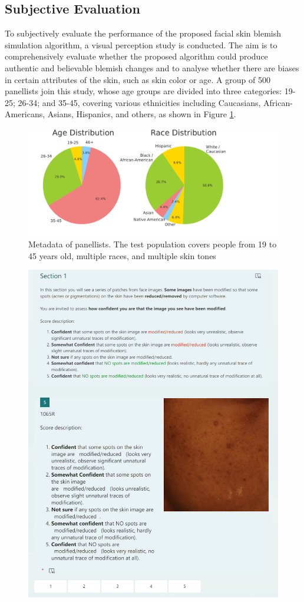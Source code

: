 \begin{spacing}{1.5}
\subsection{Subjective Evaluation}
To subjectively evaluate the performance of the proposed facial skin blemish simulation algorithm, a visual perception study is conducted. The aim is to comprehensively evaluate whether the proposed algorithm could produce authentic and believable blemish changes and to analyse whether there are biases in certain attributes of the skin, such as skin color or age. A group of 500 panellists join this study, whose age groups are divided into three categories: 19-25; 26-34; and 35-45, covering various ethnicities including Caucasians, African-Americans, Asians, Hispanics, and others, as shown in Figure \ref{fig:metadata}.
\begin{figure}[t!]
    \includegraphics[width=0.95\columnwidth]{Chapter4/metadata.pdf}
    \caption{Metadata of panellists. The test population covers people from 19 to 45 years old, multiple races, and multiple skin tones}
    \label{fig:metadata}
\end{figure} 
\begin{figure}[t!]
    \centering
    \includegraphics[width=0.9\columnwidth]{Chapter4/sample_form1.png}

\end{figure}
\end{spacing}
